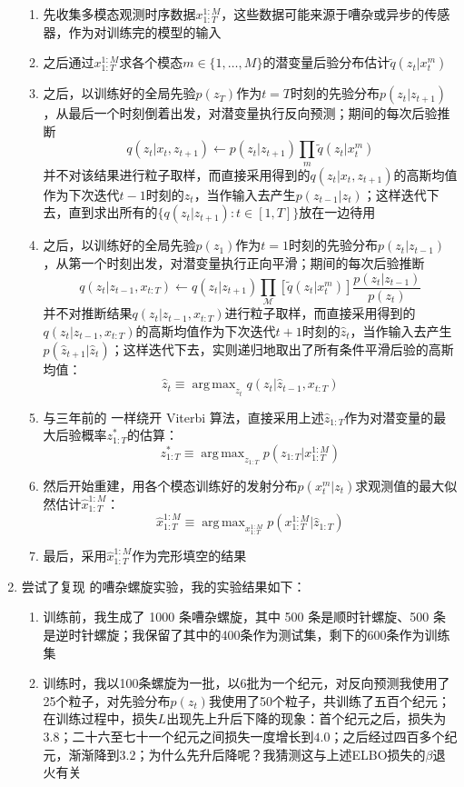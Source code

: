 \documentclass[11pt]{article}
\DeclareMathOperator*{\argmax}{arg\,max}
\begin{document}
\begin{enumerate}
\begin{enumerate}
\item 先收集多模态观测时序数据$x_{1:T}^{1:M}$，这些数据可能来源于嘈杂或异步的传感器，作为对训练完的模型的输入
\item 之后通过$x_{1:T}^{1:M}$求各个模态$m\in\{1,\dots,M\}$的潜变量后验分布估计$\tilde{q}(z_t|x_t^m)$
\item 之后，以训练好的全局先验$p(z_T)$作为$t=T$时刻的先验分布$p(z_t|z_{t+1})$，从最后一个时刻倒着出发，对潜变量执行反向预测；期间的每次后验推断\[
q(z_t|x_{t},z_{t+1})\leftarrow p(z_t|z_{t+1})\prod_m\tilde{q}(z_t|x_t^m)
\]并不对该结果进行粒子取样，而直接采用得到的$q(z_t|x_{t},z_{t+1})$的高斯均值作为下次迭代$t-1$时刻的$z_t$，当作输入去产生$p(z_{t-1}|z_t)$；这样迭代下去，直到求出所有的$\{q(z_t|z_{t+1}):t\in[1,T]\}$放在一边待用
\item 之后，以训练好的全局先验$p(z_1)$作为$t=1$时刻的先验分布$p(z_t|z_{t-1})$，从第一个时刻出发，对潜变量执行正向平滑；期间的每次后验推断\[
q(z_t|z_{t-1},x_{t:T})\leftarrow q(z_t|z_{t+1})\prod_\mathcal{M}[\tilde{q}(z_t|x_t^m)]\frac{p(z_t|z_{t-1})}{p(z_t)}
\]并不对推断结果$q(z_t|z_{t-1},x_{t:T})$进行粒子取样，而直接采用得到的$q(z_t|z_{t-1},x_{t:T})$的高斯均值作为下次迭代$t+1$时刻的$\hat{z}_t$，当作输入去产生$p(\hat{z}_{t+1}|\hat{z}_t)$；这样迭代下去，实则递归地取出了所有条件平滑后验的高斯均值：\[
\hat{z}_{t}\equiv\argmax_{z_t}q(z_t|\hat{z}_{t-1},x_{t:T})
\]
\item 与三年前的 \cite{krishnan2017structured} 一样绕开 Viterbi 算法，直接采用上述$\hat{z}_{1:T}$作为对潜变量的最大后验概率$z^*_{1:T}$的估算：\[
z^*_{1:T}\equiv\argmax_{z_{1:T}}p(z_{1:T}|x_{1:T}^{1:M})
\]
\item 然后开始重建，用各个模态训练好的发射分布$p(x_t^m|z_t)$求观测值的最大似然估计$\hat{x}_{1:T}^{1:M}$：\[
\hat{x}_{1:T}^{1:M}\equiv\argmax_{x_{1:T}^{1:M}}p(x_{1:T}^{1:M}|\hat{z}_{1:T})
\]
\item 最后，采用$\hat{x}_{1:T}^{1:M}$作为完形填空的结果
\end{enumerate}
\item 尝试了复现 \cite{Tan2019FactorizedII} 的嘈杂螺旋实验，我的实验结果如下：
\begin{enumerate}
\item 训练前，我生成了 1000 条嘈杂螺旋，其中 500 条是顺时针螺旋、500 条是逆时针螺旋；我保留了其中的400条作为测试集，剩下的600条作为训练集
\item 训练时，我以100条螺旋为一批，以6批为一个纪元，对反向预测我使用了25个粒子，对先验分布$p(z_t)$我使用了50个粒子，共训练了五百个纪元；在训练过程中，损失$L$出现先上升后下降的现象：首个纪元之后，损失为$3.8$；二十六至七十一个纪元之间损失一度增长到$4.0$；之后经过四百多个纪元，渐渐降到$3.2$；为什么先升后降呢？我猜测这与上述ELBO损失的$\beta$退火有关

\end{enumerate}
\end{enumerate}
\end{document}
